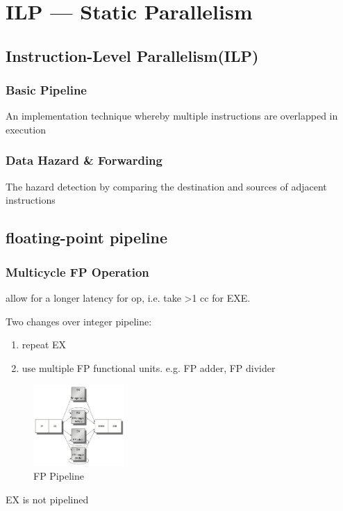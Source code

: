 \newpage
\section{ILP --- Static Parallelism}
\subsection{Instruction-Level Parallelism(ILP)}

\subsubsection{Basic Pipeline}
An implementation technique
whereby multiple instructions are
overlapped in execution
\subsubsection{Data Hazard \& Forwarding}
The hazard detection by comparing the destination and sources of adjacent instructions

\subsection{floating-point pipeline}
\subsubsection{Multicycle FP Operation}
allow for a longer latency for op, i.e. take >1 cc for EXE. 

Two changes over integer pipeline:
\begin{enumerate}
    \item repeat EX
    \item use multiple FP functional units. e.g. FP adder, FP divider
\end{enumerate}
\begin{figure}[!htb]
    \centering
    \includegraphics[width=0.309\textwidth]{pic/CA3/FP Pipeline}
    \caption{FP Pipeline}
\end{figure}

EX is not pipelined

